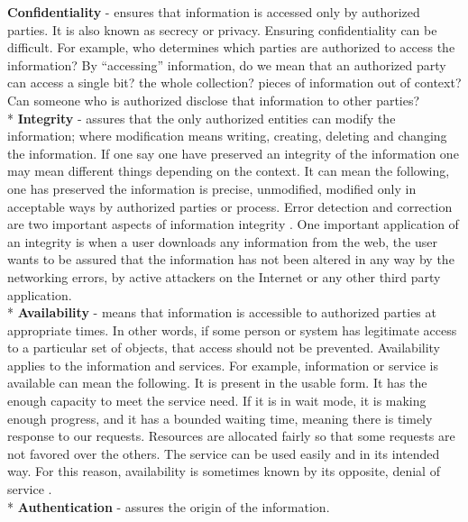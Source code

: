 	\textbf{Confidentiality} - ensures that information is accessed only by authorized parties.
	It is also known as secrecy or privacy.
	Ensuring confidentiality can be difficult.
	For example, who determines which parties are authorized to access the information?
	By ``accessing'' information, do we mean that an authorized party can access a single bit? the whole collection? pieces of information out of context?
	Can someone who is authorized disclose that information to other parties?\cite{pfleeger2002security}
	\\*
	\textbf{Integrity} - assures that the only authorized entities can modify the information; where modification means writing, creating, deleting and changing the information. 
	If one say one have preserved an integrity of the information one may mean different things depending on the context.
	It can mean the following, one has preserved the information is precise, unmodified, modified only in acceptable ways by authorized parties or process.
	Error detection and correction are two important aspects of information integrity \cite{pfleeger2002security}.
	One important application of an integrity is when a user downloads any information from the web, the user wants to be assured that the information has not been altered in any way by the networking errors, by active attackers on the Internet or any other third party application.\\*
	\textbf{Availability} - means that information is accessible to authorized parties at appropriate times.
	In other words, if some person or system has legitimate access to a particular set of objects, that access should not be prevented.
	Availability applies to the information and services.
	For example, information or service is available can mean the following. 
	It is present in the usable form.
	It has the enough capacity to meet the service need.
	If it is in wait mode, it is making enough progress, and it has a bounded waiting time, meaning there is timely response to our requests.
	Resources are allocated fairly so that some requests are not favored over the others. The service can be used easily and in its intended way.
	For this reason, availability is sometimes known by its opposite, denial of service \cite{pfleeger2002security}.
	\\*
	\textbf{Authentication} - assures the origin of the information.
